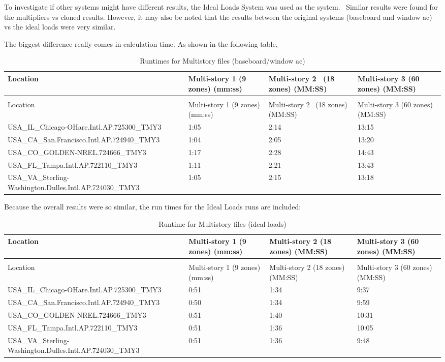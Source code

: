 To investigate if other systems might have different results, the Ideal Loads System was used as the system.~ Similar results were found for the multipliers vs cloned results. However, it may also be noted that the results between the original systems (baseboard and window ac) vs the ideal loads were very similar.

The biggest difference really comes in calculation time. As shown in the following table,

\begin{longtable}[c]{p{1.5in}p{1.5in}p{1.5in}p{1.5in}}
\caption{Runtimes for Multistory files (baseboard/window ac) \label{table:runtimes-for-multistory-files-baseboardwindow}} \tabularnewline
\toprule 
Location & Multi-story 1 (9 zones) (mm:ss) & Multi-story 2~ (18 zones) (MM:SS) & Multi-story 3 (60 zones) (MM:SS) \tabularnewline
\midrule
\endfirsthead

\caption[]{Runtimes for Multistory files (baseboard/window ac)} \tabularnewline
\toprule 
Location & Multi-story 1 (9 zones) (mm:ss) & Multi-story 2~ (18 zones) (MM:SS) & Multi-story 3 (60 zones) (MM:SS) \tabularnewline
\midrule
\endhead

USA\_IL\_Chicago-OHare.Intl.AP.725300\_TMY3 & 1:05 & 2:14 & 13:15 \tabularnewline
USA\_CA\_San.Francisco.Intl.AP.724940\_TMY3 & 1:04 & 2:05 & 13:20 \tabularnewline
USA\_CO\_GOLDEN-NREL.724666\_TMY3 & 1:17 & 2:28 & 14:43 \tabularnewline
USA\_FL\_Tampa.Intl.AP.722110\_TMY3 & 1:11 & 2:21 & 13:43 \tabularnewline
USA\_VA\_Sterling-Washington.Dulles.Intl.AP.724030\_TMY3 & 1:05 & 2:15 & 13:18 \tabularnewline
\bottomrule
\end{longtable}

Because the overall results were so similar, the run times for the Ideal Loads runs are included:

\begin{longtable}[c]{p{1.5in}p{1.5in}p{1.5in}p{1.5in}}
\caption{Runtime for Multistory files (ideal loads) \label{table:runtime-for-multistory-files-ideal-loads}} \tabularnewline
\toprule 
Location & Multi-story 1 (9 zones) (mm:ss) & Multi-story 2 (18 zones) (MM:SS) & Multi-story 3 (60 zones) (MM:SS) \tabularnewline
\midrule
\endfirsthead

\caption[]{Runtime for Multistory files (ideal loads)} \tabularnewline
\toprule 
Location & Multi-story 1 (9 zones) (mm:ss) & Multi-story 2 (18 zones) (MM:SS) & Multi-story 3 (60 zones) (MM:SS) \tabularnewline
\midrule
\endhead

USA\_IL\_Chicago-OHare.Intl.AP.725300\_TMY3 & 0:51 & 1:34 & 9:37 \tabularnewline
USA\_CA\_San.Francisco.Intl.AP.724940\_TMY3 & 0:50 & 1:34 & 9:59 \tabularnewline
USA\_CO\_GOLDEN-NREL.724666\_TMY3 & 0:51 & 1:40 & 10:31 \tabularnewline
USA\_FL\_Tampa.Intl.AP.722110\_TMY3 & 0:51 & 1:36 & 10:05 \tabularnewline
USA\_VA\_Sterling-Washington.Dulles.Intl.AP.724030\_TMY3 & 0:51 & 1:36 & 9:48 \tabularnewline
\bottomrule
\end{longtable}

